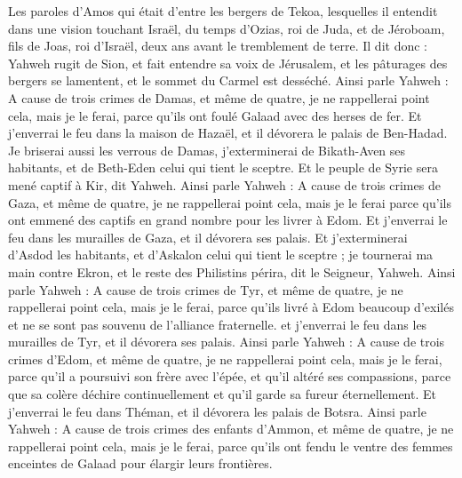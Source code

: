 \begin{multicols}{2}
\VerseOne{}Les paroles d'Amos qui était d'entre les bergers de Tekoa, lesquelles il entendit dans une vision touchant Israël, du temps d'Ozias, roi de Juda, et de Jéroboam, fils de Joas, roi d'Israël, deux ans avant le tremblement de terre.
Il dit donc : Yahweh rugit de Sion, et fait entendre sa voix de Jérusalem, et les pâturages des bergers se lamentent, et le sommet du Carmel est desséché.
Ainsi parle Yahweh : A cause de trois crimes de Damas, et même de quatre, je ne rappellerai point cela, mais je le ferai, parce qu'ils ont foulé Galaad avec des herses de fer.
Et j'enverrai le feu dans la maison de Hazaël, et il dévorera le palais de Ben-Hadad.
Je briserai aussi les verrous de Damas, j'exterminerai de Bikath-Aven ses habitants, et de Beth-Eden celui qui tient le sceptre. Et le peuple de Syrie sera mené captif à Kir, dit Yahweh.
Ainsi parle Yahweh : A cause de trois crimes de Gaza, et même de quatre, je ne rappellerai point cela, mais je le ferai parce qu'ils ont emmené des captifs en grand nombre pour les livrer à Edom.
Et j'enverrai le feu dans les murailles de Gaza, et il dévorera ses palais.
Et j'exterminerai d'Asdod les habitants, et d'Askalon celui qui tient le sceptre ; je tournerai ma main contre Ekron, et le reste des Philistins périra, dit le Seigneur, Yahweh.
Ainsi parle Yahweh : A cause de trois crimes de Tyr, et même de quatre, je ne rappellerai point cela, mais je le ferai, parce qu'ils livré à Edom beaucoup d'exilés et ne se sont pas souvenu de   l'alliance fraternelle.
et j'enverrai le feu dans les murailles de Tyr, et il dévorera ses palais.
Ainsi parle Yahweh : A cause de trois crimes d'Edom, et même de quatre, je ne rappellerai point cela, mais je le ferai, parce qu'il a poursuivi son frère avec l'épée, et qu'il altéré ses compassions, parce que sa colère déchire continuellement et qu'il garde sa fureur éternellement.
Et j'enverrai le feu dans Théman, et il dévorera les palais de Botsra.
Ainsi parle Yahweh : A cause de trois crimes des enfants d'Ammon, et même de quatre, je ne rappellerai point cela, mais je le ferai, parce qu'ils ont fendu le ventre des femmes enceintes de Galaad pour élargir leurs frontières.

\end{multicols}
